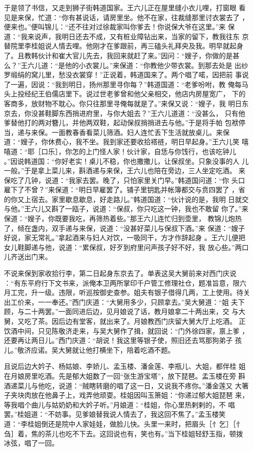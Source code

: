于是领了书信，又走到狮子街韩道国家。王六儿正在屋里缝小衣儿哩，打窗眼
看见是来保，忙道：“你有甚说话，请房里坐。他不在家，往裁缝那里讨衣裳去了
，便来也。”便叫锦儿：“还不往对过徐裁家叫你爹去！你说保大爷在这里。”来
保道：“我来说声，我明日还去不成，又有桩业障钻出来，当家的留下，教我往东
京替院里李桂姐说人情去哩。他刚才在爹跟前，再三磕头礼拜央及我。明早就起身
了。且教韩伙计和崔大官儿先去，我回来就赶了来。”因问：“嫂子，你做的是甚
么？”王六儿道：“是他的小衣裳儿。”来保道：“你教他少带衣裳。到那去处是
出纱罗缎绢的窝儿里，愁没衣裳穿！”正说着，韩道国来了。两个唱了喏，因把前
事说了一遍，因说：“我到明日，扬州那里寻你每？”韩道国道：“老爹吩咐，教
俺每马头上投经纪王伯儒店里下。说过世老爹曾和他父亲相交，他店内房屋宽广，
下的客商多，放财物不耽心。你只往那里寻俺每就是了。”来保又说：“嫂子，我
明日东京去，你没甚鞋脚东西捎进府里，与你大姐去？”王六儿道道：“没甚么，
只有他爹替他打的两对簪儿，并他两双鞋，起动保叔捎捎进去与他。”于是将手帕
包袱停当，递与来保。一面教春香看菜儿筛酒。妇人连忙丢下生活就放桌儿。来保
道：“嫂子，你休费心，我不坐。我到家还要收拾褡裢，明日早起身。”王六儿笑
嘻嘻道：“耶［口乐］，你怎的上门怪人家！伙计家，自恁与你饯行，也该吃钟儿
。”因说韩道国：“你好老实！桌儿不稳，你也撒撒儿，让保叔坐。只象没事的人
儿一般。”于是拿上菜儿来，斟酒递与来保，王六儿也陪在旁边，三人坐定吃酒。
来保吃了几钟，说道：“我家去罢。晚了，只怕家里关门早。”韩道国问道：“你
头口雇下了不曾？”来保道：“明日早雇罢了。铺子里钥匙并帐簿都交与贲四罢了
，省的你又上宿去。家里歇息歇息，好走路儿。”韩道国道：“伙计说的是，我明
日就交与他。”王六儿又斟了一瓯子，说道：“保叔，你只吃这一钟，我也不敢留
你了。”来保道：“嫂子，你既要我吃，再筛热着些。”那王六儿连忙归到壶里，
教锦儿炮热了，倾在盏内，双手递与来保，说道：“没甚好菜儿与保叔下酒。”来
保道：“嫂子好说，家无常礼。”拿起酒来与妇人对饮，一吸同干，方才作辞起身
。王六儿便把女儿鞋脚递与他，说道：“累保叔，好歹到府里问声孩子好不好，我
放心些。”两口儿齐送出门来。

不说来保到家收拾行李，第二日起身东京去了。单表这吴大舅前来对西门庆说
：“有东平府行下文书来，派俺本卫两所掌印千户管工修理社仓，题准旨意，限六
月工完，升一级。违限，听巡按御史查参。姐夫有银子借得几两，工上使用。待关
出工价来，一一奉还。”西门庆道：“大舅用多少，只顾拿去。”吴大舅道：“姐
夫下顾，与二十两罢。”一面同进后边，见月娘说了话，教月娘拿二十两出来，交
与大舅，又吃了茶。因后边有堂客，就出来了。月娘教西门庆留大舅大厅上吃酒。
正饮酒中间，只见陈敬济走来，与吴大舅作了揖，就回说：“门外徐四家，禀上爹
，还要再让两日儿。”西门庆道：“胡说！我这里等银子使，照旧还去骂那狗弟子
孩儿。”敬济应诺。吴大舅就让他打横坐下，陪着吃酒不题。

且说后边大妗子、杨姑娘、李娇儿、孟玉楼、潘金莲、李瓶儿、大姐，都伴桂
姐在月娘房里吃酒。先是郁大姐数了一回“张生游宝塔”，放下琵琶。孟玉楼在旁
斟酒递菜儿与他吃，说道：“贼瞎转磨的唱了这一日，又说我不疼你。”潘金莲又
大箸子夹块肉放在他鼻子上，戏弄他顽耍。桂姐因叫玉箫姐：“你递过郁大姐琵琶
来，等我唱个曲儿与姑奶奶和大妗子听。”月娘道：“桂姐，你心里热剌剌的，不
唱罢。”桂姐道：“不妨事。见爹娘替我说人情去了，我这回不焦了。”孟玉楼笑
道：“李桂姐倒还是院中人家娃娃，做脸儿快。头里一来时，把眉头［忄乞］［忄
刍］着，焦的茶儿也吃不下去。这回说也有，笑也有。”当下桂姐轻舒玉指，顿拨
冰弦，唱了一回。

